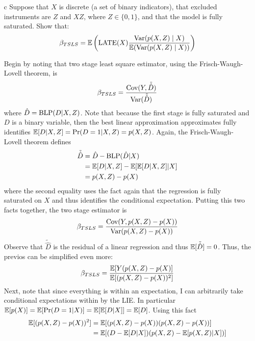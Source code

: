 \documentclass{article}
\begin{document}
\begin{problem}{c}
Suppose that $X$ is discrete (a set of binary indicators), that excluded instruments are $Z$ and $X Z$, where $Z \in\{0,1\}$, and that the model is fully saturated. Show that:
\begin{align*}
\beta_{T S L S}=\mathbb{E}\left(\operatorname{LATE}(X) \frac{\operatorname{Var}(p(X, Z) \mid X)}{\mathbb{E}(\operatorname{Var}(p(X, Z) \mid X))}\right)
\end{align*}
\end{problem}
\begin{solution}
Begin by noting that two stage least square estimator, using the Frisch-Waugh-Lovell theorem, is
\begin{equation*}
    \beta_{TSLS} = \frac{\text{Cov}(Y,\tilde{\hat{D}})}{\text{Var}(\tilde{\hat{D}})}
\end{equation*}
where $\hat{D}=\text{BLP}(D\vert X,Z)$. Note that because the first stage is fully saturated and $D$ is a binary variable, then the best linear approximation approximates fully identifies $\mathbb{E}[D\vert X,Z]=\Pr(D=1\vert X,Z) = p(X,Z)$. Again, the Frisch-Waugh-Lovell theorem defines
\begin{align*}
    \tilde{\hat{D}} &= \hat{D} - \text{BLP}(\hat{D}\vert X) \\ 
    &= \mathbb{E}[D\vert X,Z] - \mathbb{E}[\mathbb{E}[D\vert X,Z]\vert X] \\ 
    &= p(X,Z) - p(X)
\end{align*}
where the second equality uses the fact again that the regression is fully saturated on $X$ and thus identifies the conditional expectation. Putting this two facts together, the two stage estimator is 
\begin{align*}
    \beta_{TSLS} = \frac{\text{Cov}(Y,p(X,Z) - p(X))}{\text{Var}(p(X,Z) - p(X))}
\end{align*}
Observe that $\tilde{\hat{D}}$ is the residual of a linear regression and thus $\mathbb{E}[\tilde{\hat{D}}]=0$. Thus, the previos can be simplified even more:
\begin{equation*}
    \beta_{TSLS} = \frac{\mathbb{E}[Y(p(X,Z) - p(X)]}{\mathbb{E}[(p(X,Z) - p(X))^2]}
\end{equation*}
Next, note that since everything is within an expectation, I can arbitrarily take conditional expectations within by the LIE. In particular $\mathbb{E}[p(X)]=\mathbb{E}[\Pr(D=1\vert X)]=\mathbb{E}[\mathbb{E}[D\vert X]] = \mathbb{E}[D]$. Using this fact
\begin{align*}
    \E[(p(X,Z) - p(X))^2] &= \E[(p(X,Z) - p(X))(p(X,Z) - p(X))] \\ 
    &= \E[(D - \E[D\vert X])(p(X,Z) - \E[p(X,Z)\vert X])] \\ 

\end{align*}
\end{solution}
\end{document}
